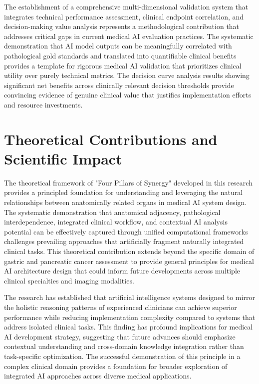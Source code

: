 The establishment of a comprehensive multi-dimensional validation system that integrates technical performance assessment, clinical endpoint correlation, and decision-making value analysis represents a methodological contribution that addresses critical gaps in current medical AI evaluation practices. The systematic demonstration that AI model outputs can be meaningfully correlated with pathological gold standards and translated into quantifiable clinical benefits provides a template for rigorous medical AI validation that prioritizes clinical utility over purely technical metrics. The decision curve analysis results showing significant net benefits across clinically relevant decision thresholds provide convincing evidence of genuine clinical value that justifies implementation efforts and resource investments.

\section{Theoretical Contributions and Scientific Impact}

The theoretical framework of "Four Pillars of Synergy" developed in this research provides a principled foundation for understanding and leveraging the natural relationships between anatomically related organs in medical AI system design. The systematic demonstration that anatomical adjacency, pathological interdependence, integrated clinical workflow, and contextual AI analysis potential can be effectively captured through unified computational frameworks challenges prevailing approaches that artificially fragment naturally integrated clinical tasks. This theoretical contribution extends beyond the specific domain of gastric and pancreatic cancer assessment to provide general principles for medical AI architecture design that could inform future developments across multiple clinical specialties and imaging modalities.

The research has established that artificial intelligence systems designed to mirror the holistic reasoning patterns of experienced clinicians can achieve superior performance while reducing implementation complexity compared to systems that address isolated clinical tasks. This finding has profound implications for medical AI development strategy, suggesting that future advances should emphasize contextual understanding and cross-domain knowledge integration rather than task-specific optimization. The successful demonstration of this principle in a complex clinical domain provides a foundation for broader exploration of integrated AI approaches across diverse medical applications.

